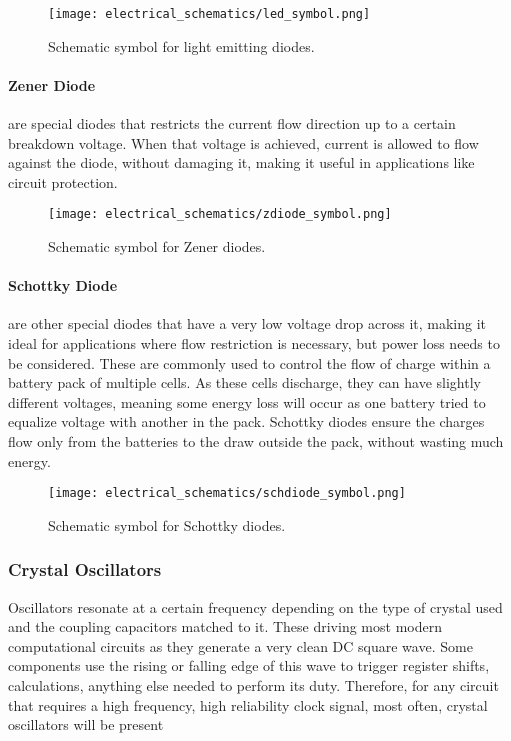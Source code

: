         \begin{figure}[h!]
            \texttt{[image: electrical\_schematics/led\_symbol.png]}
            \caption[LED Symbol]{Schematic symbol for light emitting diodes.}
        \end{figure}

        \paragraph*{Zener Diode} are special diodes that restricts the current flow direction up to a certain breakdown voltage.
        When that voltage is achieved, current is allowed to flow against the diode, without damaging it, making it useful in applications like circuit protection.

        \begin{figure}[h!]
            \texttt{[image: electrical\_schematics/zdiode\_symbol.png]}
            \caption[Zener Diode Symbol]{Schematic symbol for Zener diodes.}
        \end{figure}

        \paragraph*{Schottky Diode} are other special diodes that have a very low voltage drop across it, making it ideal for applications where flow restriction is necessary, but power loss needs to be considered.
        These are commonly used to control the flow of charge within a battery pack of multiple cells.
        As these cells discharge, they can have slightly different voltages, meaning some energy loss will occur as one battery tried to equalize voltage with another in the pack.
        Schottky diodes ensure the charges flow only from the batteries to the draw outside the pack, without wasting much energy.

        \begin{figure}[h!]
            \texttt{[image: electrical\_schematics/schdiode\_symbol.png]}
            \caption[Schottky Diode Symbol]{Schematic symbol for Schottky diodes.}
        \end{figure}

        \subsubsection*{Crystal Oscillators}
        Oscillators resonate at a certain frequency depending on the type of crystal used and the coupling capacitors matched to it.
        These driving most modern computational circuits as they generate a very clean DC square wave. 
        Some components use the rising or falling edge of this wave to trigger register shifts, calculations, anything else needed to perform its duty.
        Therefore, for any circuit that requires a high frequency, high reliability clock signal, most often, crystal oscillators will be present

